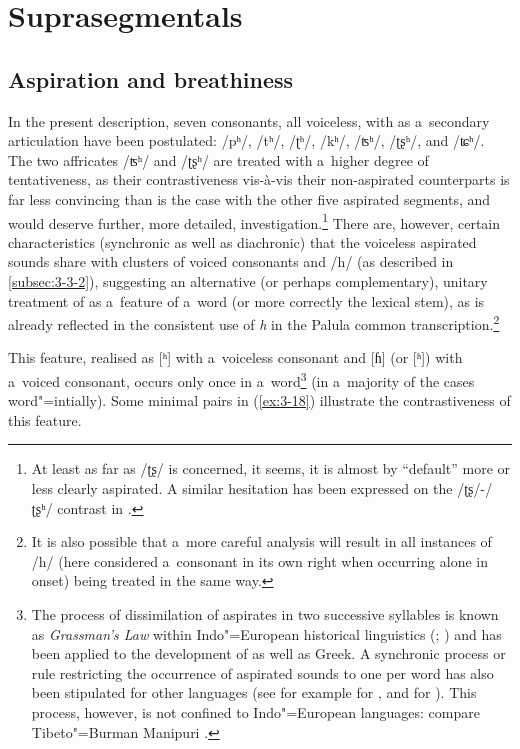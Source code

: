 \section{Suprasegmentals}
\label{sec:3-4}

\subsection{Aspiration and breathiness}
\label{subsec:3-4-1}

In the present description, seven consonants, all voiceless, with  as a~secondary articulation have been postulated: /pʰ/, /tʰ/, /ʈʰ/, /kʰ/, /ʦʰ/, /ʈʂʰ/, and /ʨʰ/. The two affricates /ʦʰ/ and /ʈʂʰ/ are treated with a~higher degree of tentativeness, as their contrastiveness vis-à-vis their non-aspirated counterparts is far less convincing than is the case with the other five aspirated segments, and would deserve further, more detailed, investigation.\footnote{At least as far as /ʈʂ/ is concerned, it seems, it is almost by ``default'' more or less clearly aspirated. A similar hesitation has been expressed on the /ʈʂ/-/ʈʂʰ/ contrast in \iliKhowar \citep[239]{endresenkristiansen1981}.} There are, however, certain characteristics (synchronic as well as diachronic) that the voiceless aspirated sounds share with clusters of voiced consonants and /h/ (as described in \ref{subsec:3-3-2}), suggesting an alternative (or perhaps complementary), unitary treatment of  as a~feature of a~word (or more correctly the lexical stem), as is already reflected in the consistent use of \textit{h} in the Palula common transcription.\footnote{It is also possible that a~more careful analysis will result in all instances of /h/ (here considered a~consonant in its own right when occurring alone in  onset) being treated in the same way.} 


This feature, realised as [ʰ] with a~voiceless consonant and [ɦ] (or [ʱ]) with a~voiced consonant, occurs only once in a~word\footnote{\label{fnt:ftn32} The process of dissimilation of aspirates in two successive syllables is known as \textit{Grassman's Law} within Indo"=European historical linguistics (\citealt[19, 56]{szemerenyi1996}; \citealt[153--154, 162--163]{lehmann1992}) and has been applied to the development of \iliOIA as well as Greek. A synchronic process or rule restricting the occurrence of aspirated sounds to one per word has also been stipulated for other \iliNIA languages (see for example \citet[32]{losey2002} for \iliGojri, and \citet[34--35]{shackle1976} for \iliSiraiki). This process, however, is not confined to Indo"=European languages: compare Tibeto"=Burman Manipuri \citep[13--14]{bhatningomba1997}.} (in a~majority of the cases word"=intially). Some minimal pairs in (\ref{ex:3-18}) illustrate the contrastiveness of this feature.


